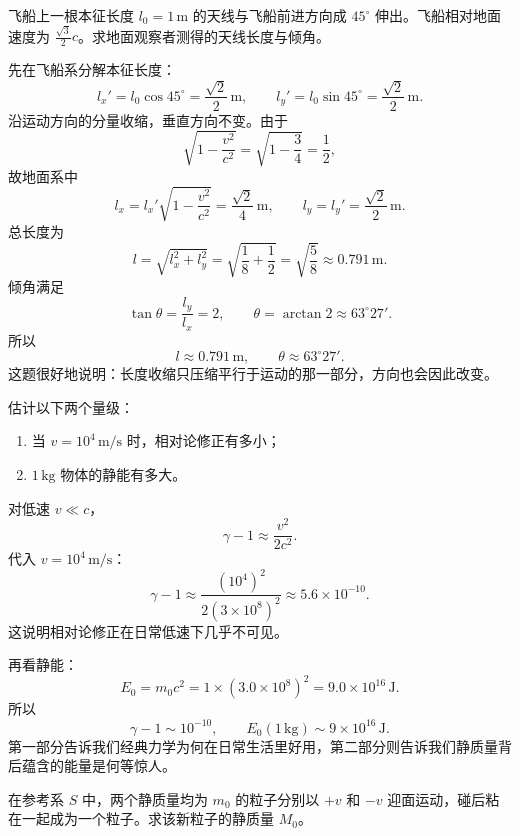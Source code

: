 \documentclass[lang=cn,11pt]{elegantbook}
\begin{document}
\begin{example}
飞船上一根本征长度 \(l_0=1\,\mathrm{m}\) 的天线与飞船前进方向成 \(45^\circ\) 伸出。飞船相对地面速度为 \(\frac{\sqrt3}{2}c\)。求地面观察者测得的天线长度与倾角。
\end{example}

\begin{solution}
先在飞船系分解本征长度：
\[
l_x'=l_0\cos45^\circ=\frac{\sqrt2}{2}\,\mathrm{m},
\qquad
l_y'=l_0\sin45^\circ=\frac{\sqrt2}{2}\,\mathrm{m}.
\]
沿运动方向的分量收缩，垂直方向不变。由于
\[
\sqrt{1-\frac{v^2}{c^2}}
=\sqrt{1-\frac34}
=\frac12,
\]
故地面系中
\[
l_x=l_x'\sqrt{1-\frac{v^2}{c^2}}
=\frac{\sqrt2}{4}\,\mathrm{m},
\qquad
l_y=l_y'=\frac{\sqrt2}{2}\,\mathrm{m}.
\]
总长度为
\[
l=\sqrt{l_x^2+l_y^2}
=\sqrt{\frac18+\frac12}
=\sqrt{\frac58}
\approx 0.791\,\mathrm{m}.
\]
倾角满足
\[
\tan\theta=\frac{l_y}{l_x}=2,
\qquad
\theta=\arctan 2\approx 63^\circ 27'.
\]
所以
\[
\boxed{l\approx 0.791\,\mathrm{m},\qquad \theta\approx 63^\circ 27'.}
\]
这题很好地说明：长度收缩只压缩平行于运动的那一部分，方向也会因此改变。
\end{solution}

\begin{example}[低速修正量级与静能量级]
估计以下两个量级：
\begin{enumerate}
  \item 当 \(v=10^4\,\mathrm{m/s}\) 时，相对论修正有多小；
  \item \(1\,\mathrm{kg}\) 物体的静能有多大。
\end{enumerate}
\end{example}

\begin{solution}
对低速 \(v\ll c\)，
\[
\gamma-1\approx \frac{v^2}{2c^2}.
\]
代入 \(v=10^4\,\mathrm{m/s}\)：
\[
\gamma-1\approx \frac{(10^4)^2}{2(3\times 10^8)^2}
\approx 5.6\times 10^{-10}.
\]
这说明相对论修正在日常低速下几乎不可见。

再看静能：
\[
E_0=m_0c^2=1\times (3.0\times 10^8)^2
=9.0\times 10^{16}\,\mathrm{J}.
\]
所以
\[
\boxed{\gamma-1\sim 10^{-10},\qquad E_0(1\,\mathrm{kg})\sim 9\times 10^{16}\,\mathrm{J}.}
\]
第一部分告诉我们经典力学为何在日常生活里好用，第二部分则告诉我们静质量背后蕴含的能量是何等惊人。
\end{solution}

\begin{example}[两个相向粒子粘在一起后的静质量]
在参考系 \(S\) 中，两个静质量均为 \(m_0\) 的粒子分别以 \(+v\) 和 \(-v\) 迎面运动，碰后粘在一起成为一个粒子。求该新粒子的静质量 \(M_0\)。
\end{example}
\end{document}
